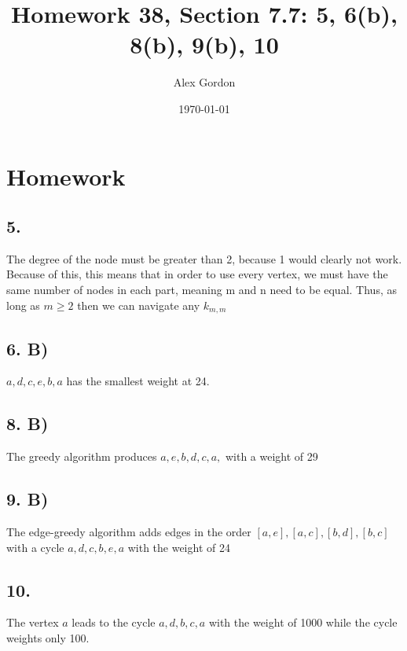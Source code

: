 \documentclass[12]{scrartcl}
\begin{document}
\title{Homework 38, Section 7.7: 5, 6(b), 8(b), 9(b), 10}
\author{Alex Gordon}
\date{\today}
\maketitle
\section*{Homework}
\subsection*{5.}
The degree of the node must be greater than 2, because 1 would clearly not work. Because of this, this means that in order to use every vertex, we must have the same number of nodes in each part, meaning m and n need to be equal. Thus, as long as $m \geq 2$ then we can navigate any $k_{m,m}$
\subsection*{6. B)}
$a, d, c, e, b, a$ has the smallest weight at 24. 
\subsection*{8. B)}
The greedy algorithm produces $a, e, b, d, c, a, $ with a weight of 29
\subsection*{9. B)}
The edge-greedy algorithm adds edges in the order $[a, e], [a, c ], [b ,d ], [b ,c ] $with a cycle $a, d, c, b, e, a$ with the weight of 24
\subsection*{10.}
The vertex $a$ leads to the cycle $a, d, b, c, a$ with the weight of 1000 while the cycle weights only 100. 
 
\end{document}
